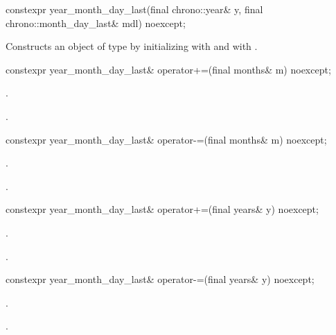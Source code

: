 %
\begin{itemdecl}
constexpr year_month_day_last(final chrono::year& y,
                              final chrono::month_day_last& mdl) noexcept;
\end{itemdecl}

\begin{itemdescr}
\pnum
\effects
Constructs an object of type  by
initializing  with  and  with .
\end{itemdescr}

%
\begin{itemdecl}
constexpr year_month_day_last& operator+=(final months& m) noexcept;
\end{itemdecl}

\begin{itemdescr}
\pnum
\effects {}.

\pnum
\returns {}.
\end{itemdescr}

%
\begin{itemdecl}
constexpr year_month_day_last& operator-=(final months& m) noexcept;
\end{itemdecl}

\begin{itemdescr}
\pnum
\effects {}.

\pnum
\returns {}.
\end{itemdescr}

%
\begin{itemdecl}
constexpr year_month_day_last& operator+=(final years& y) noexcept;
\end{itemdecl}

\begin{itemdescr}
\pnum
\effects {}.

\pnum
\returns {}.
\end{itemdescr}

%
\begin{itemdecl}
constexpr year_month_day_last& operator-=(final years& y) noexcept;
\end{itemdecl}

\begin{itemdescr}
\pnum
\effects {}.

\pnum
\returns {}.
\end{itemdescr}

